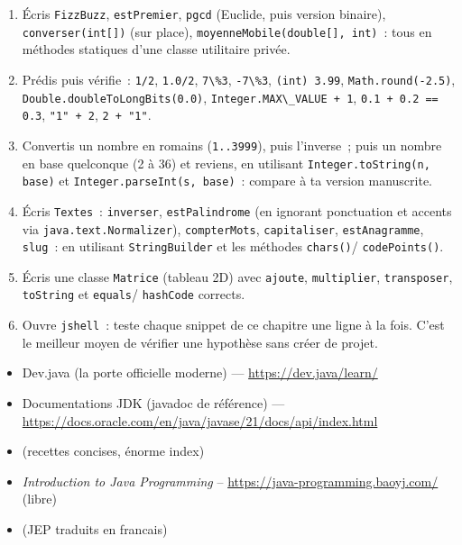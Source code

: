 \begin{exercice}
\begin{enumerate}
  \item \'Ecris \verb|FizzBuzz|, \verb|estPremier|, \verb|pgcd| (Euclide, puis version binaire),
        \verb|converser(int[])| (sur place), \verb|moyenneMobile(double[], int)|~: tous en
        m\'ethodes statiques d'une classe utilitaire priv\'ee.
  \item Pr\'edis puis v\'erifie~: \verb|1/2|, \verb|1.0/2|, \verb|7\%3|, \verb|-7\%3|,
        \verb|(int) 3.99|, \verb|Math.round(-2.5)|, \verb|Double.doubleToLongBits(0.0)|,
        \verb|Integer.MAX\_VALUE + 1|, \verb|0.1 + 0.2 == 0.3|, \verb|"1" + 2|, \verb|2 + "1"|.
  \item Convertis un nombre en romains (\verb|1..3999|), puis l'inverse~; puis un nombre en
        base quelconque (2 \`a 36) et reviens, en utilisant \verb|Integer.toString(n, base)|
        et \verb|Integer.parseInt(s, base)|~: compare \`a ta version manuscrite.
  \item \'Ecris \verb|Textes|~: \verb|inverser|, \verb|estPalindrome| (en ignorant ponctuation et
        accents via \verb|java.text.Normalizer|), \verb|compterMots|, \verb|capitaliser|,
        \verb|estAnagramme|, \verb|slug|~: en utilisant \verb|StringBuilder| et les m\'ethodes
        \verb|chars()|/ \verb|codePoints()|.
  \item \'Ecris une classe \verb|Matrice| (tableau 2D) avec \verb|ajoute|, \verb|multiplier|,
        \verb|transposer|, \verb|toString| et \verb|equals|/ \verb|hashCode| corrects.
  \item Ouvre \verb|jshell|~: teste chaque snippet de ce chapitre une ligne \`a la fois.
        C'est le meilleur moyen de v\'erifier une hypoth\`ese sans cr\'eer de projet.
\end{enumerate}
\end{exercice}

\begin{ressources}
\begin{itemize}
  \item Dev.java (la porte officielle moderne) --- \url{https://dev.java/learn/}
  \item Documentations JDK (javadoc de r\'ef\'erence) --- \url{https://docs.oracle.com/en/java/javase/21/docs/api/index.html}
  \item {} (recettes concises, \'enorme index)
  \item \emph{Introduction to Java Programming} -- \url{https://java-programming.baoyj.com/} (libre)
  \item {} (JEP traduits en francais)
\end{itemize}
\end{ressources}


